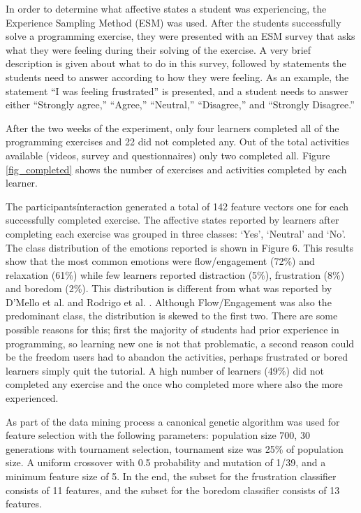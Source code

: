 \documentclass[a4paper,twoside]{article}
\begin{document}
In order to determine what affective states a student was experiencing, the
Experience Sampling Method (ESM) \cite{kubey1996experience} was used.
After the students successfully solve a programming exercise, they were presented
with an ESM survey that asks what they were feeling during their solving of the
exercise. A very brief description is given about what to do in this survey,
followed by statements the students need to answer according to how they were
feeling. As an example, the statement “I was feeling frustrated” is presented,
and a student needs to answer either “Strongly agree,” “Agree,” “Neutral,”
“Disagree,” and “Strongly Disagree.”

After the two weeks of the experiment, only four learners completed all of the
programming exercises and 22 did not completed any. Out of the total activities
available (videos, survey and questionnaires) only two completed all. Figure \ref{fig_completed}
shows the number of exercises and activities completed by each learner.
  
The participants\' interaction generated a total of 142 feature vectors one for each
successfully completed exercise. The affective states reported by learners after
completing each exercise was grouped in three classes: ‘Yes’, ‘Neutral’ and
‘No’. The class distribution of the emotions reported is shown in Figure 6. This
results show that the most common emotions were flow/engagement (72\%) and
relaxation (61\%) while few learners reported distraction (5\%), frustration
(8\%) and boredom (2\%). This distribution is different from what was reported
by D’Mello et al. \cite{bixler2013detecting} and Rodrigo et al. \cite{rodrigo2009affective}.
Although Flow/Engagement was
also the predominant class, the distribution is skewed to the first two. There
are some possible reasons for this; first the majority of students had
prior experience in programming, so learning new one is not that problematic, a second
reason could be the freedom users had to abandon the activities, perhaps
frustrated or bored learners simply quit the tutorial. A high number of learners
(49\%) did not completed any exercise and the once who completed more where also
the more experienced.

As part of the data mining process a canonical genetic algorithm was used for feature
selection with the following parameters: population size 700, 30 generations with
tournament selection, tournament size was 25\% of population size. A uniform crossover 
with 0.5 probability and mutation of 1/39, and a minimum feature size of 5.
In the end, the subset for the frustration classifier
consists of 11 features, and the subset for the boredom classifier consists of
13 features.
\end{document}
